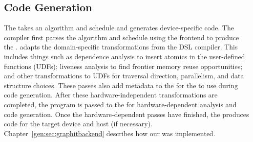 \subsection{Code Generation}
The \ugc takes an algorithm and schedule and generates device-specific code.
The compiler first parses the algorithm and schedule using the frontend to produce the \graphisa. 
\GG adapts the domain\hyp{}specific transformations from the \graphit DSL compiler.
This includes things such as dependence analysis to insert atomics in the user\hyp{}defined functions (UDFs); liveness analysis to find frontier memory reuse opportunities; and other transformations to UDFs for
traversal direction, parallelism, and data structure choices.
These passes also add metadata to the \graphisa for the \graphvms to use during code generation.
After these hardware-independent transformations are completed, the program is passed to the \graphvm for hardware-dependent analysis and code generation.
Once the hardware-dependent passes have finished, the \graphvm produces code for the target device and host (if necessary).
Chapter~\ref{gen:sec:graphitbackend} describes how our \hb \graphvm was implemented.
